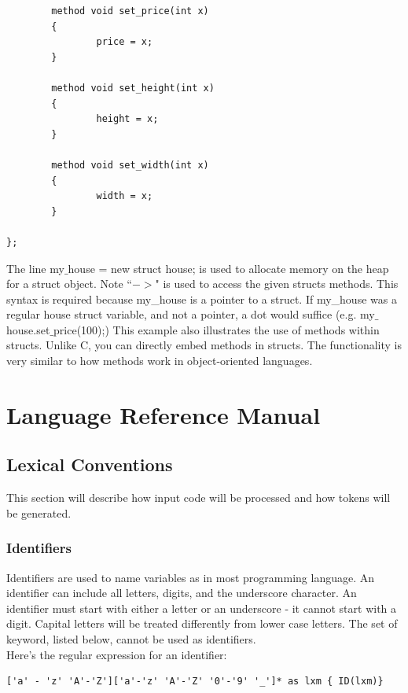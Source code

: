 \documentclass{article}
\begin{document}
\begin{enumerate}
\begin{lstlisting}
        method void set_price(int x)
        {
                price = x;
        }

        method void set_height(int x)
        {
                height = x;
        }

        method void set_width(int x)
        {
                width = x;
        }
        
};
\end{lstlisting}
The line  my$\_$house = new struct house; is used to allocate memory on the heap for a struct object. Note ``$->$" is used to access the given structs methods. This syntax is required because my\_house is a pointer to a struct. If my\_house was a regular house struct variable, and not a pointer, a dot would suffice (e.g. my$\_$house.set$\_$price(100);) This example also illustrates the use of methods within structs. Unlike C, you can directly embed methods in structs. The functionality is very similar to how methods work in object-oriented languages.
\end{enumerate}

\newpage
\section{Language Reference Manual}

\subsection{Lexical Conventions}
This section will describe how input code will be processed and how tokens will be generated.

\subsubsection{Identifiers}
Identifiers are used to name variables as in most programming language. An identifier can include all letters, digits, and the underscore character.  An identifier must start with either a letter or an underscore - it cannot start with a digit.  Capital letters will be treated differently from lower case letters. The set of keyword, listed below, cannot be used as identifiers.
\\
Here's the regular expression for an identifier:

\begin{Verbatim}[frame=single]
['a' - 'z' 'A'-'Z']['a'-'z' 'A'-'Z' '0'-'9' '_']* as lxm { ID(lxm)}
\end{Verbatim}
\end{document}
